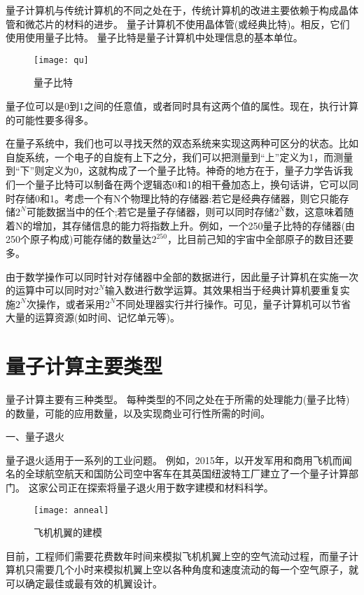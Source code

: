 \documentclass{hfutpaper}
\newcommand{\upcite}[1]{\textsuperscript{\textsuperscript{\cite{#1}}}}
\begin{document}
量子计算机与传统计算机的不同之处在于，传统计算机的改进主要依赖于构成晶体管和微芯片的材料的进步。
量子计算机不使用晶体管(或经典比特)。相反，它们使用使用量子比特。
量子比特是量子计算机中处理信息的基本单位。
\begin{figure}[H]%
	\centering  %
	\texttt{[image: qu]}  %
	\caption{量子比特}  %
	\label{fig1}
\end{figure}
量子位可以是0到1之间的任意值，或者同时具有这两个值的属性。现在，执行计算的可能性要多得多。%

在量子系统中，我们也可以寻找天然的双态系统来实现这两种可区分的状态。比如自旋系统，一个电子的自旋有上下之分，我们可以把测量到“上”定义为1，而测量到“下”则定义为0，这就构成了一个量子比特。神奇的地方在于，量子力学告诉我们一个量子比特可以制备在两个逻辑态0和1的相干叠加态上，换句话讲，它可以同时存储0和1。考虑一个有N个物理比特的存储器:若它是经典存储器，则它只能存储$2^N$可能数据当中的任个;若它是量子存储器，则可以同时存储$2^N$数，这意味着随着N的增加，其存储信息的能力将指数上升。例如，一个250量子比特的存储器(由250个原子构成)可能存储的数量达$2^250$，比目前己知的宇宙中全部原子的数目还要多。

由于数学操作可以同时针对存储器中全部的数据进行，因此量子计算机在实施一次的运算中可以同时对$2^N$输入数进行数学运算。其效果相当于经典计算机要重复实施$2^N$次操作，或者采用$2^N$不同处理器实行并行操作。可见，量子计算机可以节省大量的运算资源(如时间、记忆单元等)。
\section{量子计算主要类型}
量子计算主要有三种类型。 每种类型的不同之处在于所需的处理能力(量子比特)的数量，可能的应用数量，以及实现商业可行性所需的时间。

一、量子退火

量子退火适用于一系列的工业问题。 例如，2015年，以开发军用和商用飞机而闻名的全球航空航天和国防公司空中客车在其英国纽波特工厂建立了一个量子计算部门。
这家公司正在探索将量子退火用于数字建模和材料科学。

\begin{figure}[H]%
	\centering  %
	\texttt{[image: anneal]}  %
	\caption{飞机机翼的建模}  %
	\label{fig1}
\end{figure}

目前，工程师们需要花费数年时间来模拟飞机机翼上空的空气流动过程，而量子计算机只需要几个小时来模拟机翼上空以各种角度和速度流动的每一个空气原子，就可以确定最佳或最有效的机翼设计。
\end{document}
